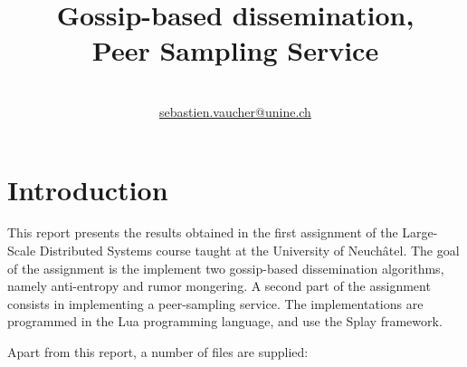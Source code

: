 \documentclass[11pt,a4paper]{scrartcl}
\author{\myauthor\\ \href{mailto:sebastien.vaucher@unine.ch}{sebastien.vaucher@unine.ch}}
\title{\huge \textbf{Gossip-based dissemination,\\ Peer Sampling Service}}
\begin{document}
\nocite{*}

\begin{titlingpage}

\begin{otherlanguage}{australian}
\maketitle
\end{otherlanguage}

\setcounter{tocdepth}{2}
\tableofcontents

\begin{figure}[b]
\centering
{}
\qquad
{}
\end{figure}

\end{titlingpage}

\pagebreak

\section{Introduction}

This report presents the results obtained in the first assignment of the Large-Scale Distributed Systems course taught at the University of Neuchâtel. The goal of the assignment is the implement two gossip-based dissemination algorithms, namely anti-entropy and rumor mongering. A second part of the assignment consists in implementing a peer-sampling service. The implementations are programmed in the Lua programming language, and use the Splay framework.

Apart from this report, a number of files are supplied:
\end{document}
